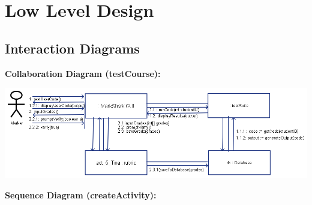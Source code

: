 \documentclass{article}
\begin{document}
\section{Low Level Design}
\subsection{Interaction Diagrams}
\textbf{Collaboration Diagram (testCourse):}\\
\centerline{\includegraphics[scale=0.5]{../images/designDocImages/Collaboration_Diagram_Use_Case.png}}
\clearpage
\textbf{Sequence Diagram (createActivity):}\\
\end{document}
